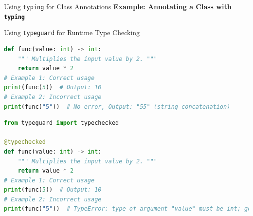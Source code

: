 \documentclass[10pt]{beamer}
\let\olditem\item
\renewcommand\item{\olditem\justifying}
\begin{document}
	
	\begin{frame}{Using \texttt{typing} for Class Annotations}
		\textbf{Example: Annotating a Class with \texttt{typing}}
		
	
		
	\end{frame}
	
	
	
	\begin{frame}[fragile]{Using \texttt{typeguard} for Runtime Type Checking}
		\begin{lstlisting}[language=Python, caption=Without \texttt{typechecked}]
def func(value: int) -> int:
	""" Multiplies the input value by 2. """
	return value * 2
# Example 1: Correct usage
print(func(5))  # Output: 10
# Example 2: Incorrect usage
print(func("5"))  # No error, Output: "55" (string concatenation)
		\end{lstlisting}
		
		\begin{lstlisting}[language=Python, caption=With \texttt{typechecked}]
from typeguard import typechecked

@typechecked
def func(value: int) -> int:
	""" Multiplies the input value by 2. """
	return value * 2
# Example 1: Correct usage
print(func(5))  # Output: 10
# Example 2: Incorrect usage
print(func("5"))  # TypeError: type of argument "value" must be int; got str instead
		\end{lstlisting}
	\end{frame}
	
\end{document}
